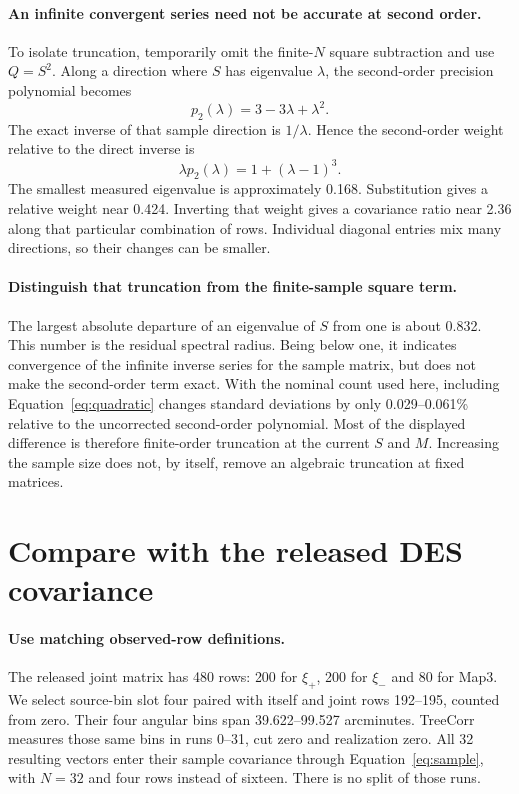 \documentclass[11pt]{article}
\begin{document}
\paragraph{An infinite convergent series need not be accurate at second order.}
To isolate truncation, temporarily omit the finite-$N$ square subtraction
and use $Q=S^2$. Along a direction where $S$ has eigenvalue $\lambda$, the
second-order precision polynomial becomes
\begin{equation}
 p_2(\lambda)=3-3\lambda+\lambda^2.
\end{equation}
The exact inverse of that sample direction is $1/\lambda$. Hence the
second-order weight relative to the direct inverse is
\begin{equation}
 \lambda p_2(\lambda)=1+(\lambda-1)^3.
\end{equation}
The smallest measured eigenvalue is approximately 0.168. Substitution gives
a relative weight near 0.424. Inverting that weight gives a covariance
ratio near 2.36 along that particular combination of rows. Individual
diagonal entries mix many directions, so their changes can be smaller.

\paragraph{Distinguish that truncation from the finite-sample square term.}
The largest absolute departure of an eigenvalue of $S$ from one is
about 0.832. This number is the residual spectral radius. Being below
one, it indicates convergence of the infinite inverse series for the sample
matrix, but does not make the second-order term exact. With the nominal
count used here, including Equation~\eqref{eq:quadratic} changes standard
deviations by only 0.029--0.061\% relative to the uncorrected second-order
polynomial. Most of the displayed difference is therefore finite-order
truncation at the current $S$ and $M$. Increasing the sample size does not,
by itself, remove an algebraic truncation at fixed matrices.

\section{Compare with the released DES covariance}
\paragraph{Use matching observed-row definitions.}
The released joint matrix has 480 rows: 200 for $\xi_+$, 200 for $\xi_-$
and 80 for Map3. We select source-bin slot four paired with itself and
joint rows 192--195, counted from zero. Their four angular bins span
39.622--99.527 arcminutes. TreeCorr~\cite{treecorr} measures those same
bins in runs 0--31, cut zero and realization zero. All 32 resulting vectors
enter their sample covariance through Equation~\eqref{eq:sample}, with
$N=32$ and four rows instead of sixteen. There is no split of those runs.
\end{document}
